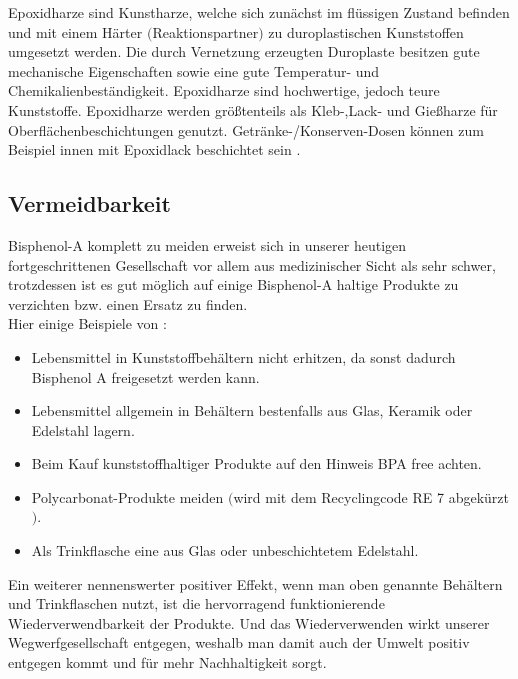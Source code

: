 Epoxidharze sind Kunstharze, welche sich zunächst im flüssigen Zustand befinden
und mit einem Härter $($Reaktionspartner$)$ zu duroplastischen Kunststoffen
umgesetzt werden\cite{Umweltbundesamt2016}. \glqq Die durch Vernetzung erzeugten
Duroplaste besitzen gute mechanische Eigenschaften sowie eine gute Temperatur-
und Chemikalienbeständigkeit. Epoxidharze sind
hochwertige, jedoch teure Kunststoffe. Epoxidharze werden größtenteils \glqq als
Kleb-,Lack- und Gießharze für Oberflächenbeschichtungen genutzt.
Getränke-/Konserven-Dosen können zum Beispiel innen mit Epoxidlack beschichtet sein \cite{Bund}.
\subsection{Vermeidbarkeit}
Bisphenol-A komplett zu meiden erweist sich in unserer heutigen
fortgeschrittenen Gesellschaft vor allem aus medizinischer
Sicht als sehr schwer, trotzdessen ist es gut möglich auf einige Bisphenol-A haltige Produkte zu verzichten bzw. einen Ersatz zu finden.\\
Hier einige Beispiele von \cite{Utopia}:
\begin{itemize}
    \item Lebensmittel in Kunststoffbehältern nicht erhitzen, da sonst dadurch Bisphenol A freigesetzt werden kann.
    \item Lebensmittel allgemein in Behältern bestenfalls aus Glas, Keramik oder Edelstahl lagern.
    \item Beim Kauf kunststoffhaltiger Produkte auf den Hinweis \glqq BPA free\grqq{} achten.
    \item Polycarbonat-Produkte meiden $($wird mit dem Recyclingcode RE 7 abgekürzt$)$.
    \item Als Trinkflasche eine aus Glas oder unbeschichtetem Edelstahl.
\end{itemize}
Ein weiterer nennenswerter positiver Effekt, wenn man oben genannte Behältern
und Trinkflaschen nutzt, ist die hervorragend funktionierende Wiederverwendbarkeit
der Produkte. Und das Wiederverwenden wirkt
unserer \glqq Wegwerfgesellschaft\grqq{} entgegen, weshalb man damit auch der Umwelt
positiv entgegen kommt und für mehr Nachhaltigkeit sorgt.
